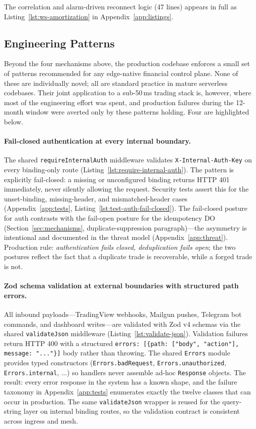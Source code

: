 The correlation and alarm-driven reconnect logic (47 lines) appears in full as Listing~\ref{lst:ws-amortization} in Appendix~\ref{app:listings}.

\subsection{Engineering Patterns}
\label{sec:patterns}

Beyond the four mechanisms above, the production codebase enforces a small set of patterns recommended for any edge-native financial control plane. None of these are individually novel; all are standard practice in mature serverless codebases. Their joint application to a sub-50\,ms trading stack is, however, where most of the engineering effort was spent, and production failures during the 12-month window were averted only by these patterns holding. Four are highlighted below.

\paragraph{Fail-closed authentication at every internal boundary.}
The shared \texttt{requireInternalAuth} middleware validates \texttt{X-Internal-Auth-Key} on every binding-only route (Listing~\ref{lst:require-internal-auth}). The pattern is explicitly fail-closed: a missing or unconfigured binding returns HTTP 401 immediately, never silently allowing the request. Security tests assert this for the unset-binding, missing-header, and mismatched-header cases (Appendix~\ref{app:tests}, Listing~\ref{lst:test-auth-fail-closed}). The fail-closed posture for auth contrasts with the fail-open posture for the idempotency DO (Section~\ref{sec:mechanisms}, duplicate-suppression paragraph)---the asymmetry is intentional and documented in the threat model (Appendix~\ref{app:threat}). Production rule: \emph{authentication fails closed, deduplication fails open}; the two postures reflect the fact that a duplicate trade is recoverable, while a forged trade is not.

\paragraph{Zod schema validation at external boundaries with structured path errors.}
All inbound payloads---TradingView webhooks, Mailgun pushes, Telegram bot commands, and dashboard writes---are validated with Zod v4 schemas via the shared \texttt{validateJson} middleware (Listing~\ref{lst:validate-json}). Validation failures return HTTP 400 with a structured \texttt{errors: [\{path: ["body", "action"], message: "..."\}]} body rather than throwing. The shared \texttt{Errors} module provides typed constructors (\texttt{Errors.badRequest}, \texttt{Errors.unauthorized}, \texttt{Errors.internal}, ...) so handlers never assemble ad-hoc \texttt{Response} objects. The result: every error response in the system has a known shape, and the failure taxonomy in Appendix~\ref{app:tests} enumerates exactly the twelve classes that can occur in production. The same \texttt{validateJson} wrapper is reused for the query-string layer on internal binding routes, so the validation contract is consistent across ingress and mesh.

